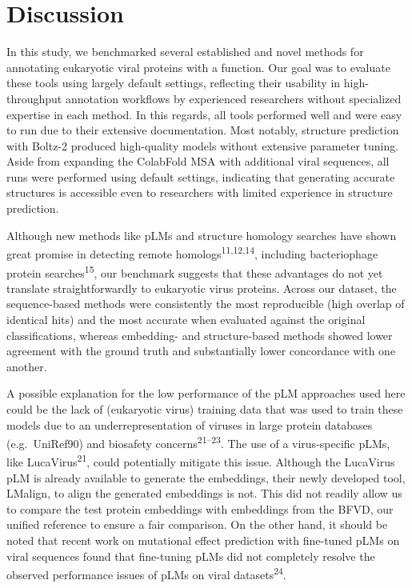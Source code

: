 \documentclass[
  sn-nature,
]{sn-jnl}
\begin{document}
\section{Discussion}\label{discussion}

In this study, we benchmarked several established and novel methods for
annotating eukaryotic viral proteins with a function. Our goal was to
evaluate these tools using largely default settings, reflecting their
usability in high-throughput annotation workflows by experienced
researchers without specialized expertise in each method. In this
regards, all tools performed well and were easy to run due to their
extensive documentation. Most notably, structure prediction with Boltz-2
produced high-quality models without extensive parameter tuning. Aside
from expanding the ColabFold MSA with additional viral sequences, all
runs were performed using default settings, indicating that generating
accurate structures is accessible even to researchers with limited
experience in structure prediction.

Although new methods like pLMs and structure homology searches have
shown great promise in detecting remote
homologs\textsuperscript{11,12,14}, including bacteriophage protein
searches\textsuperscript{15}, our benchmark suggests that these
advantages do not yet translate straightforwardly to eukaryotic virus
proteins. Across our dataset, the sequence-based methods were
consistently the most reproducible (high overlap of identical hits) and
the most accurate when evaluated against the original classifications,
whereas embedding- and structure-based methods showed lower agreement
with the ground truth and substantially lower concordance with one
another.

A possible explanation for the low performance of the pLM approaches
used here could be the lack of (eukaryotic virus) training data that was
used to train these models due to an underrepresentation of viruses in
large protein databases (e.g.~UniRef90) and biosafety
concerns\textsuperscript{21--23}. The use of a virus-specific pLMs, like
LucaVirus\textsuperscript{21}, could potentially mitigate this issue.
Although the LucaVirus pLM is already available to generate the
embeddings, their newly developed tool, LMalign, to align the generated
embeddings is not. This did not readily allow us to compare the test
protein embeddings with embeddings from the BFVD, our unified reference
to ensure a fair comparison. On the other hand, it should be noted that
recent work on mutational effect prediction with fine-tuned pLMs on
viral sequences found that fine-tuning pLMs did not completely resolve
the observed performance issues of pLMs on viral
datasets\textsuperscript{24}.
\end{document}
